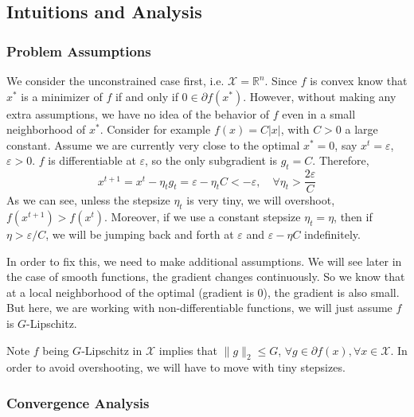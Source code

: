 \documentclass{scrartcl}
\newcommand{\RR}{\mathbb{R}}
\newcommand{\sX}{\mathcal{X}}
\begin{document}
\subsection{Intuitions and Analysis}

\subsubsection{Problem Assumptions}
\label{sec:subgrad-descent-assumption}

We consider the unconstrained case first, i.e. $\sX=\RR^n$. Since $f$ is convex know that $x^*$ is a
minimizer of $f$ if and only if $0\in\partial f (x^*)$. However, without making any extra
assumptions, we have no idea of the behavior of $f$ even in a small neighborhood of $x^*$. Consider
for example $f(x)=C|x|$, with $C>0$ a large constant. Assume we are currently very close to the
optimal $x^*=0$, say $x^t=\varepsilon$, $\varepsilon>0$. $f$ is differentiable at $\varepsilon$, so
the only subgradient is $g_t=C$. Therefore,
\[
  x^{t+1} = x^t - \eta_t g_t
  = \varepsilon - \eta_tC < -\varepsilon, \quad \forall \eta_t > \frac {2\varepsilon} {C}
\]
As we can see, unless the stepsize $\eta_t$ is very tiny, we will overshoot, $f(x^{t+1})>f(x^t)$.
Moreover, if we use a constant stepsize $\eta_t=\eta$, then if $\eta >\varepsilon/C$, we will be
jumping back and forth at $\varepsilon$ and $\varepsilon - \eta C$ indefinitely.

In order to fix this, we need to make additional assumptions. We will see later in the case of
smooth functions, the gradient changes continuously. So we know that at a local neighborhood of the
optimal (gradient is 0), the gradient is also small. But here, we are working with
non-differentiable functions, we will just assume $f$ is $G$-Lipschitz.

Note $f$ being $G$-Lipschitz in $\sX$ implies that $\|g\|_2 \leq G$, $\forall g\in\partial f(x),
\forall x\in\sX$. In order to avoid overshooting, we will have to move with tiny stepsizes.

\subsubsection{Convergence Analysis}
\label{sec:subgrad-lipschitz-analysis}
\end{document}

